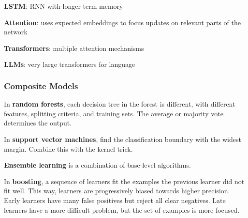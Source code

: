 \documentclass[11pt]{article}
\begin{document}
\textbf{LSTM}: RNN with longer-term memory

\textbf{Attention}: uses expected embeddings to focus updates on relevant parts of the network

\textbf{Transformers}: multiple attention mechanisms

\textbf{LLMs}: very large transformers for language
\subsubsection{Composite Models}
\label{sec:org442526d}
In \textbf{random forests}, each decision tree in the forest is different, with different features,
splitting criteria, and training sets.
The average or majority vote determines the output.

In \textbf{support vector machines}, find the classification boundary with the widest margin.
Combine this with the kernel trick.

\textbf{Ensemble learning} is a combination of base-level algorithms.

In \textbf{boosting}, a sequence of learners fit the examples the previous learner did not fit well.
This way, learners are progressively biased towards higher precision.
Early learners have many false positives but reject all clear negatives.
Late learners have a more difficult problem, but the set of examples is more focused.
\end{document}
